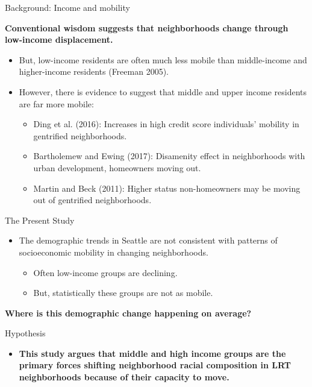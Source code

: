 \documentclass[11pt,ignorenonframetext,]{beamer}
\providecommand{\tightlist}{%
  \setlength{\itemsep}{0pt}\setlength{\parskip}{0pt}}
\begin{document}
\begin{frame}{Background: Income and mobility}
\protect\hypertarget{background-income-and-mobility}{}

\textbf{Conventional wisdom suggests that neighborhoods change through
low-income displacement.}

\begin{itemize}
\item
  But, low-income residents are often much less mobile than
  middle-income and higher-income residents (Freeman 2005).
\item
  However, there is evidence to suggest that middle and upper income
  residents are far more mobile:

  \begin{itemize}
  \tightlist
  \item
    Ding et al. (2016): Increases in high credit score individuals'
    mobility in gentrified neighborhoods.
  \item
    Bartholemew and Ewing (2017): Disamenity effect in neighborhoods
    with urban development, homeowners moving out.
  \item
    Martin and Beck (2011): Higher status non-homeowners may be moving
    out of gentrified neighborhoods.
  \end{itemize}
\end{itemize}

\end{frame}

\begin{frame}{The Present Study}
\protect\hypertarget{the-present-study-1}{}

\begin{itemize}
\tightlist
\item
  The demographic trends in Seattle are not consistent with patterns of
  socioeconomic mobility in changing neighborhoods.

  \begin{itemize}
  \tightlist
  \item
    Often low-income groups are declining.
  \item
    But, statistically these groups are not as mobile.
  \end{itemize}
\end{itemize}

\textbf{Where is this demographic change happening on average?}

\end{frame}

\begin{frame}{Hypothesis}
\protect\hypertarget{hypothesis}{}

\begin{itemize}
\tightlist
\item
  \textbf{This study argues that middle and high income groups are the
  primary forces shifting neighborhood racial composition in LRT
  neighborhoods because of their capacity to move.}
\end{itemize}

\end{frame}
\end{document}

